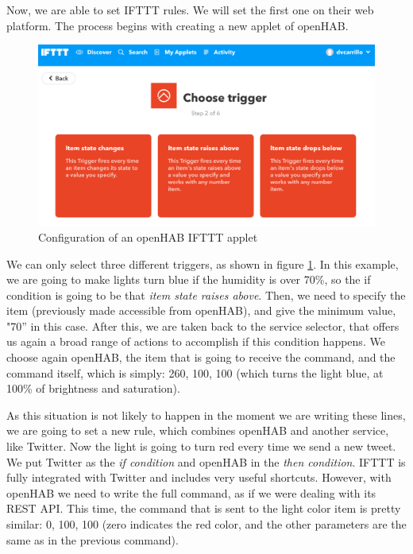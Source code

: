 Now, we are able to set IFTTT rules. We will set the first one on their web platform. The process begins with creating a new applet
of openHAB.

\begin{figure}
	\centering
	\includegraphics[width=1\textwidth]{images/Chapter_06/selection-iftt.png}
	\caption{Configuration of an openHAB IFTTT applet}
	\label{fig:selection-iftt}
\end{figure}

We can only select three different triggers, as shown in figure \ref{fig:selection-iftt}. In this example, we are going to make lights
turn blue if the humidity is over 70\%, so the if condition is going to be that \textit{item state raises above}. Then, we need to
specify the item (previously made accessible from openHAB), and give the minimum value, "70” in this case. After this, we are taken
back to the service selector, that offers us again a broad range of actions to accomplish if this condition happens. We choose again
openHAB, the item that is going to receive the command, and the command itself, which is simply: 260, 100, 100 (which turns the
light blue, at 100\% of brightness and saturation).

As this situation is not likely to happen in the moment we are writing these lines, we are going to set a new rule, which combines
openHAB and another service, like Twitter. Now the light is going to turn red every time we send a new tweet. We put Twitter as the
\textit{if condition} and openHAB in the \textit{then condition}. IFTTT is fully integrated with Twitter and includes very useful
shortcuts. However, with openHAB we need to write the full command, as if we were dealing with its REST API. This time, the command
that is sent to the light color item is pretty similar: 0, 100, 100 (zero indicates the red color, and the other parameters are the
same as in the previous command).

